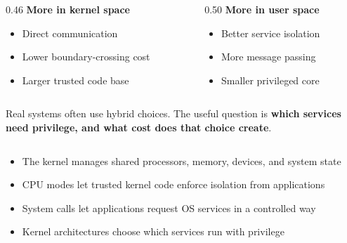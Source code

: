 \begin{slide}
  

  \begin{columns}[T,onlytextwidth]
    \begin{column}{0.46\textwidth}
      \textbf{More in kernel space}
      \begin{itemize}
        \item Direct communication
        \item Lower boundary-crossing cost
        \item Larger trusted code base
      \end{itemize}
    \end{column}
    \begin{column}{0.50\textwidth}
      \textbf{More in user space}
      \begin{itemize}
        \item Better service isolation
        \item More message passing
        \item Smaller privileged core
      \end{itemize}
    \end{column}
  \end{columns}

  \bigskip

  Real systems often use hybrid choices. The useful question is \textbf{which services need privilege, and what cost does that choice create}.
\end{slide}

\begin{slide}


	\inputminted{c}{write_print.c}


	\medskip

\end{slide}

\begin{slide}


	\begin{itemize}
		\item The kernel manages shared processors, memory, devices, and system state
		\item CPU modes let trusted kernel code enforce isolation from applications
		\item System calls let applications request OS services in a controlled way
		\item Kernel architectures choose which services run with privilege
	\end{itemize}

	\bigskip


\end{slide}


